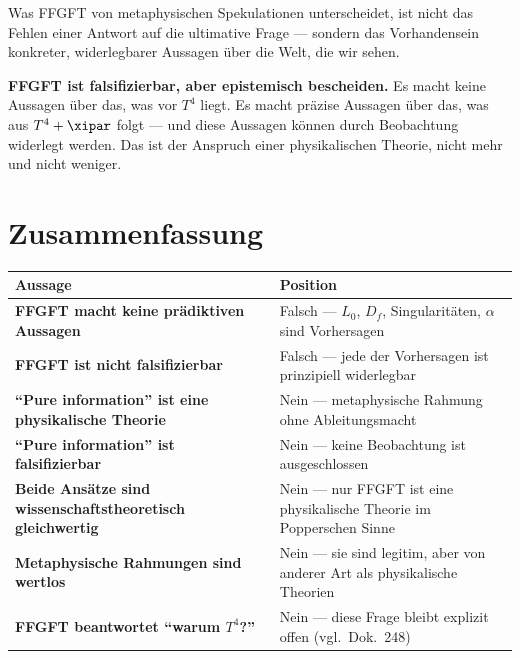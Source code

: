 Was FFGFT von metaphysischen Spekulationen unterscheidet, ist nicht das Fehlen einer Antwort auf die ultimative Frage --- sondern das Vorhandensein konkreter, widerlegbarer Aussagen über die Welt, die wir sehen.

\begin{erkenntnis}
\textbf{FFGFT ist falsifizierbar, aber epistemisch bescheiden.} Es macht keine Aussagen über das, was vor $T^4$ liegt. Es macht präzise Aussagen über das, was aus $T^4 + \xipar$ folgt --- und diese Aussagen können durch Beobachtung widerlegt werden. Das ist der Anspruch einer physikalischen Theorie, nicht mehr und nicht weniger.
\end{erkenntnis}

\section*{Zusammenfassung}

\begin{longtable}{>{\bfseries}p{7.2cm} p{7.2cm}}
\toprule
Aussage & Position \\
\midrule
FFGFT macht keine prädiktiven Aussagen & Falsch --- $L_0$, $D_f$, Singularitäten, $\alpha$ sind Vorhersagen \\
FFGFT ist nicht falsifizierbar & Falsch --- jede der Vorhersagen ist prinzipiell widerlegbar \\
``Pure information'' ist eine physikalische Theorie & Nein --- metaphysische Rahmung ohne Ableitungsmacht \\
``Pure information'' ist falsifizierbar & Nein --- keine Beobachtung ist ausgeschlossen \\
Beide Ansätze sind wissenschaftstheoretisch gleichwertig & Nein --- nur FFGFT ist eine physikalische Theorie im Popperschen Sinne \\
Metaphysische Rahmungen sind wertlos & Nein --- sie sind legitim, aber von anderer Art als physikalische Theorien \\
FFGFT beantwortet ``warum $T^4$?'' & Nein --- diese Frage bleibt explizit offen (vgl.\ Dok.~248) \\
\bottomrule
\end{longtable}
